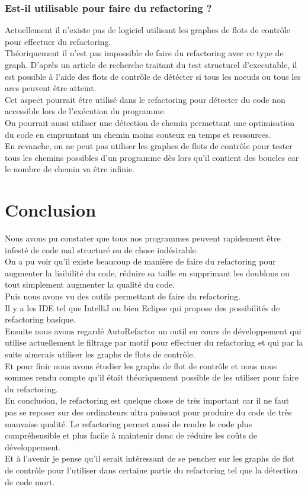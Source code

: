 \documentclass[a4paper,twoside,12pt,openright]{report}
\begin{document}
\subsection{Est-il utilisable pour faire du refactoring ?}
Actuellement il n'existe pas de logiciel utilisant les graphes de flots de contrôle pour effectuer du refactoring.\\
Théoriquement il n'est pas impossible de faire du refactoring avec ce type de graph.
D'après un article de recherche traitant du test structurel d'executable, il est possible à l'aide des flots de contrôle de détécter si tous les noeuds ou tous les arcs peuvent être atteint\cite{ref12}.\\
Cet aspect pourrait être utilisé dans le refactoring pour détecter du code non accessible lors de l'exécution du programme.\\
On pourrait aussi utiliser une détection de chemin
permettant une optimisation du code en empruntant un chemin moins couteux en temps et ressources.\\
En revanche, on ne peut pas utiliser les graphes de flots de contrôle pour tester tous les chemins possibles d'un programme dès lors qu'il contient des boucles car le nombre de chemin va être infinie.\\


\chapter{Conclusion}
Nous avons pu constater que tous nos programmes peuvent rapidement être infesté de code mal structuré ou de chose indésirable.\\
On a pu voir qu'il existe beaucoup de manière de faire du refactoring pour augmenter la lisibilité du code, réduire sa taille en supprimant les doublons ou tout simplement augmenter la qualité du code.\\
Puis nous avons vu des outils permettant de faire du refactoring.\\
Il y a les IDE tel que IntelliJ ou bien Eclipse qui propose des possibilités de refactoring basique.\\
Ensuite nous avons regardé AutoRefactor un outil en cours de développement qui utilise actuellement le filtrage par motif pour effectuer du refactoring et qui par la suite aimerais utiliser les graphs de flots de contrôle.\\
Et pour finir nous avons étudier les graphs de flot de contrôle et nous nous sommes rendu compte qu'il était théoriquement possible de les utiliser pour faire du refactoring.\\
En conclusion, le refactoring est quelque chose de très important car il ne faut pas se reposer sur des ordinateurs ultra puissant pour produire du code de très mauvaise qualité. Le refactoring permet aussi de rendre le code plus compréhensible et plus facile à maintenir donc de réduire les coûts de développement.\\
Et à l'avenir je pense qu'il serait intéressant de se pencher sur les graphs de flot de contrôle pour l'utiliser dans certaine partie du refactoring tel que la détection de code mort.\\




\end{document}
